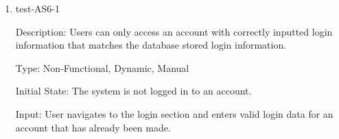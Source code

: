 \documentclass[12pt, titlepage]{article}
\begin{document}
\begin{enumerate}











  \item{test-AS6-1\\}
  
  Description: Users can only access an account with correctly
  inputted login information that matches the database
  stored login information.
  
  Type: Non-Functional, Dynamic, Manual

  Initial State: The system is not logged in to an account.

  Input: User navigates to the login section and enters valid login data for
  an account that has already been made.


\end{enumerate}
\end{document}
